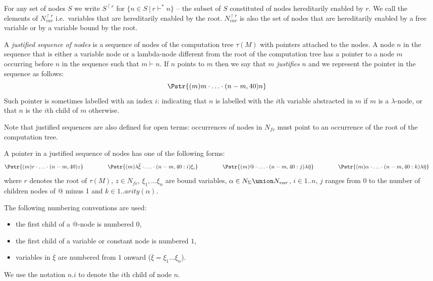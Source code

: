 For any set of nodes $S$ we write $S^{\upharpoonright r}$ for $\{ n \in S \ | \ r  \vdash^* n \}$ -- the subset of $S$ constituted of
nodes hereditarily enabled by $r$.
We call  the elements of $N_{var}^{\upharpoonright r}$ i.e.\
variables that are hereditarily enabled by the root. $N_{var}^{\upharpoonright r}$ is also the set of nodes that are hereditarily enabled by a free variable or by a variable bound by the root.

\begin{dfn}
A \emph{justified sequence of nodes} is a sequence of
nodes of the computation tree $\tau(M)$ with pointers attached to the nodes. A node $n$ in the sequence
that is either a variable node or a lambda-node different from the root of the computation tree
has a pointer to a node $m$ occurring before $n$ in the sequence such that $m \vdash n$.
If $n$ points to $m$ then we say that $m$ \emph{justifies} $n$ and we represent the pointer in the sequence as follows:
$$\Pstr{ (m){m} \cdot \ldots \cdot (n-m,40){n}}$$
Such pointer is sometimes labelled with an index $i$:
indicating that $n$ is labelled with the $i$th
variable abstracted in $m$ if $m$ is a $\lambda$-node, or that $n$ is the $i$th child of $m$
otherwise.
\end{dfn}
Note that justified sequences are also defined for open terms:
occurrences of nodes in $N_{fv}$ must point to an occurrence of the
root of the computation tree.

A pointer in a justified sequence of nodes has
one of the following forms: \vspace{2pt}
$$
\Pstr{ (m){r} \cdot \ldots \cdot (n-m,40){z} }
\hspace{1.5cm}
\Pstr{ (m){\lambda \overline{\xi}} \cdot \ldots \cdot (n-m,40:i){\xi_i} }
\hspace{1.5cm}
\Pstr{ (m){@} \cdot \ldots \cdot (n-m,40:j){\lambda \overline{\eta}} }
\hspace{1.5cm}
\Pstr{ (m){\alpha } \cdot \ldots \cdot (n-m,40:k){\lambda \overline{\eta}} }
$$
where $r$ denotes the root of $\tau(M)$, $z \in N_{fv}$, $\xi_1,
\ldots \xi_n$ are bound variables, $\alpha \in N_{\Sigma} \union
N_{var}$, $i \in 1..n$, $j$ ranges from $0$ to the number of
children nodes of @ minus 1 and $k \in 1 ..arity(\alpha)$.

The following numbering conventions are used:
\begin{itemize}
\item the first child of a @-node is numbered $0$,
\item the first child of a variable or constant node is numbered $1$,
\item variables in $\overline{\xi}$ are numbered from $1$ onward ($\overline{\xi} = \xi_1 \ldots \xi_n$).
\end{itemize}
We use the notation $n.i$ to denote the $i$th child of node $n$.


